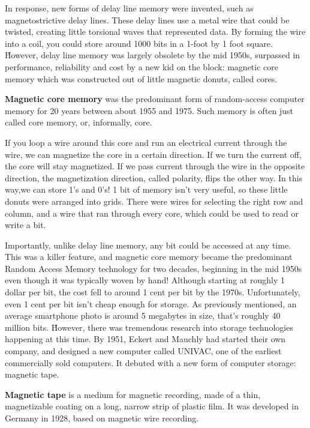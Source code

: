 In response, new forms of delay line memory were invented, such as magnetostrictive delay lines. These delay lines
use a metal wire that could be twisted, creating little torsional waves that represented data. By forming the wire
into a coil, you could store around 1000 bits in a 1-foot by 1 foot square. \v

However, delay line memory was largely obsolete by the mid 1950s, surpassed in performance, reliability and cost by a
new kid on the block: magnetic core memory which was constructed out of little magnetic donuts, called cores.

\textbf{Magnetic core memory} was the predominant form of random-access computer memory for 20 years between about
1955 and 1975. Such memory is often just called core memory, or, informally, core.
\ed

If you loop a wire around this core and run an electrical current through the wire, we can magnetize the core in a
certain direction. If we turn the current off, the core will stay magnetized. If we pass current through the wire in
the opposite direction, the magnetization direction, called polarity, flips the other way. In this way,we can store
1's and 0's! 1 bit of memory isn't very useful, so these little donuts were arranged into grids. There were wires for
selecting the right row and column, and a wire that ran through every core, which could be used to read or write a bit.


Importantly, unlike delay line memory, any bit could be accessed at any time. This was a killer feature, and magnetic
core memory became the predominant Random Access Memory technology for two decades, beginning in the mid 1950s even
though it was typically woven by hand! Although starting at roughly 1 dollar per bit, the cost fell to around 1 cent
per bit by the 1970s. Unfortunately, even 1 cent per bit isn't cheap enough for storage. As previously mentioned, an
average smartphone photo is around 5 megabytes in size, that's roughly 40 million bits. \v

However, there was tremendous research into storage technologies happening at this time. By 1951, Eckert and Mauchly
had started their own company, and designed a new computer called UNIVAC, one of the earliest commercially sold
computers. It debuted with a new form of computer storage: magnetic tape.

\textbf{Magnetic tape} is a medium for magnetic recording, made of a thin, magnetizable coating on a long, narrow
strip of plastic film. It was developed in Germany in 1928, based on magnetic wire recording.
\ed

